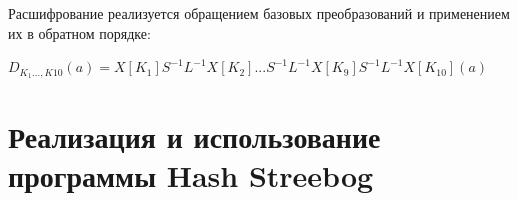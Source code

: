 \documentclass[a4paper,14pt]{report}
\begin{document}
\begin{figure}[h]
\label{fig:image}
\end{figure}

Расшифрование реализуется обращением базовых преобразований и применением их в обратном порядке:

$D_{K_{1}...,K{10}}(a) = X[K_{1}]S^{-1}L^{-1}X[K_{2}]...S^{-1}L^{-1}X[K_{9}]S^{-1}L^{-1}X[K_{10}](a)$

\chapter{Реализация и использование программы Hash Streebog}
\end{document}
